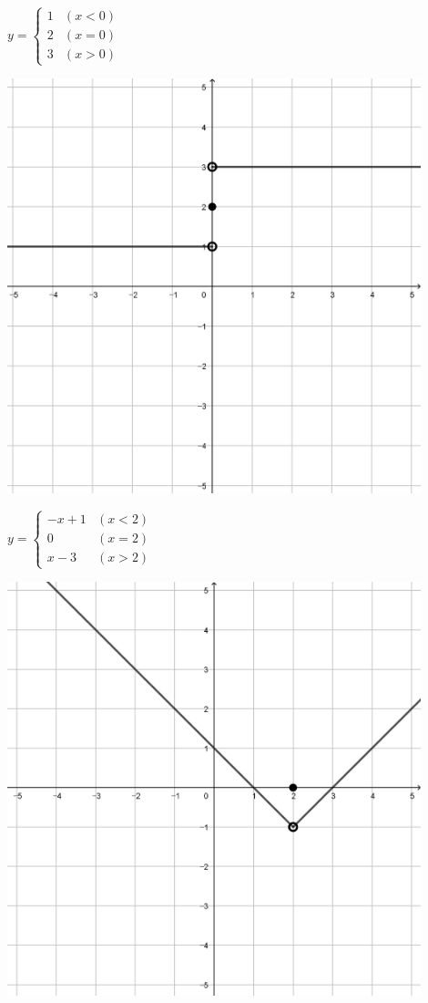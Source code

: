 \documentclass[a4paper]{oblivoir}
\begin{document}
\clearpage
\begin{minipage}{0.45\textwidth}\centering
\(y=\begin{cases}1&(x<0)\\2&(x=0)\\3&(x>0)\end{cases}\)
\par\bigskip\includegraphics[width=0.9\textwidth]{img/3_piecewise_9}
\end{minipage}
\begin{minipage}{0.45\textwidth}\centering
\(y=\begin{cases}-x+1&(x<2)\\0&(x=2)\\x-3&(x>2)\end{cases}\)
\par\bigskip\includegraphics[width=0.9\textwidth]{img/3_piecewise_10}
\end{minipage}\bigskip\bigskip\par
\end{document}

